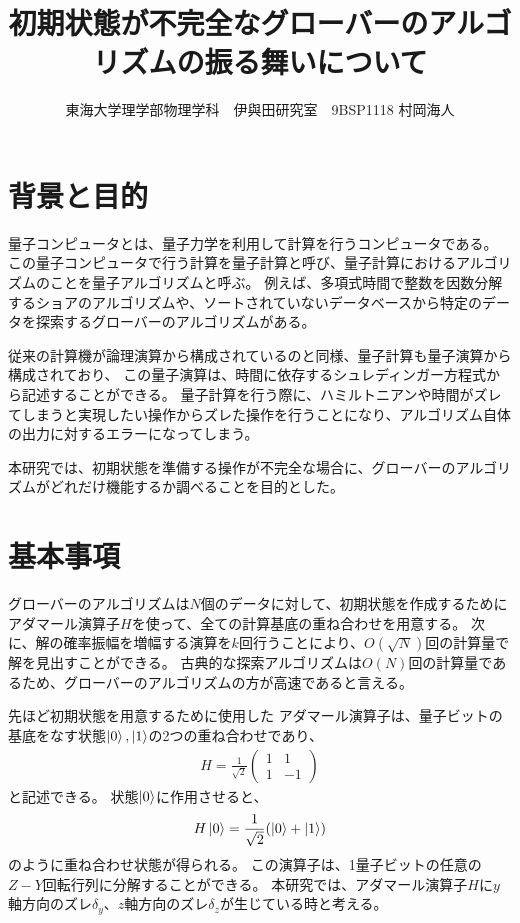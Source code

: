 \documentclass[platex,dvipdfmx, twocolumn]{jsarticle}			%
\title{初期状態が不完全なグローバーのアルゴリズムの振る舞いについて}
\author{東海大学理学部物理学科　伊與田研究室　9BSP1118 村岡海人}
\date{}
\begin{document}
\maketitle
\section{背景と目的}
量子コンピュータとは、量子力学を利用して計算を行うコンピュータである。
この量子コンピュータで行う計算を量子計算と呼び、量子計算におけるアルゴリズムのことを量子アルゴリズムと呼ぶ。
例えば、多項式時間で整数を因数分解するショアのアルゴリズムや、ソートされていないデータベースから特定のデータを探索するグローバーのアルゴリズムがある。

従来の計算機が論理演算から構成されているのと同様、量子計算も量子演算から構成されており、
この量子演算は、時間に依存するシュレディンガー方程式から記述することができる。
量子計算を行う際に、ハミルトニアンや時間がズレてしまうと実現したい操作からズレた操作を行うことになり、アルゴリズム自体の出力に対するエラーになってしまう。

本研究では、初期状態を準備する操作が不完全な場合に、グローバーのアルゴリズムがどれだけ機能するか調べることを目的とした。

\section{基本事項}
グローバーのアルゴリズムは$N個$のデータに対して、初期状態を作成するためにアダマール演算子$H$を使って、全ての計算基底の重ね合わせを用意する。
次に、解の確率振幅を増幅する演算を$k$回行うことにより、$O(\sqrt{N})$回の計算量で解を見出すことができる。
古典的な探索アルゴリズムは$O(N)$回の計算量であるため、グローバーのアルゴリズムの方が高速であると言える\cite{QuantumDojo}。

先ほど初期状態を用意するために使用した
アダマール演算子は、量子ビットの基底をなす状態$\ket{0},\ket{1}$の2つの重ね合わせであり、
\begin{eqnarray*}
    H = \frac{1}{\sqrt{2}}\begin{pmatrix}
        1 & 1\\
        1 & -1
    \end{pmatrix}
\end{eqnarray*}
と記述できる。
状態$\ket{0}$に作用させると、
\begin{eqnarray*}
    H\ket{0} = \frac{1}{\sqrt{2}}(\ket{0} + \ket{1})
\end{eqnarray*}
のように重ね合わせ状態が得られる\cite{BasicQuantumComputer}。
この演算子は、1量子ビットの任意の$Z-Y$回転行列に分解することができる\cite{QuantumComputingFundamentalsAndPhysicsContacts}。
本研究では、アダマール演算子$H$に$y$軸方向のズレ$\delta_y$、$z$軸方向のズレ$\delta_z$が生じている時と考える。
\end{document}
